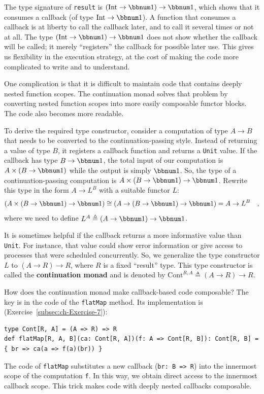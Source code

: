 The type signature of \lstinline!result! is $\left(\text{Int}\rightarrow\bbnum 1\right)\rightarrow\bbnum 1$,
which shows that it consumes a callback (of type $\text{Int}\rightarrow\bbnum 1$).
A function that consumes a callback is at liberty to call the callback
later, and to call it several times or not at all. The type $\left(\text{Int}\rightarrow\bbnum 1\right)\rightarrow\bbnum 1$
does not show whether the callback will be called; it merely \textsf{``}registers\textsf{''}
the callback for possible later use. This gives us flexibility in
the execution strategy, at the cost of making the code more complicated
to write and to understand.

One complication is that it is difficult to maintain code that contains
deeply nested function scopes. The continuation monad solves that
problem by converting nested function scopes into more easily composable
functor blocks. The code also becomes more readable.

To derive the required type constructor, consider a computation of
type $A\rightarrow B$ that needs to be converted to the continuation-passing
style. Instead of returning a value of type $B$, it registers a callback
function and returns a \lstinline!Unit! value. If the callback has
type $B\rightarrow\bbnum 1$, the total input of our computation is
$A\times\left(B\rightarrow\bbnum 1\right)$ while the output is simply
$\bbnum 1$. So, the type of a continuation-passing computation is
$A\times\left(B\rightarrow\bbnum 1\right)\rightarrow\bbnum 1$. Rewrite
this type in the form $A\rightarrow L^{B}$ with a suitable functor
$L$:
\[
\left(A\times\left(B\rightarrow\bbnum 1\right)\rightarrow\bbnum 1\right)\cong\left(A\rightarrow\left(B\rightarrow\bbnum 1\right)\rightarrow\bbnum 1\right)=A\rightarrow L^{B}\quad,
\]
where we need to define $L^{A}\triangleq\left(A\rightarrow\bbnum 1\right)\rightarrow\bbnum 1$.

It is sometimes helpful if the callback returns a more informative
value than \lstinline!Unit!. For instance, that value could show
error information or give access to processes that were scheduled
concurrently. So, we generalize the type constructor $L$ to $\left(A\rightarrow R\right)\rightarrow R$,
where $R$ is a fixed \textsf{``}result\textsf{''} type. This type constructor is
called the \textbf{continuation monad}
and is denoted by $\text{Cont}^{R,A}\triangleq\left(A\rightarrow R\right)\rightarrow R$.

How does the continuation monad make callback-based code composable?
The key is in the code of the \lstinline!flatMap! method. Its implementation
is (Exercise~\ref{subsec:ch-Exercise-7}):
\begin{lstlisting}
type Cont[R, A] = (A => R) => R
def flatMap[R, A, B](ca: Cont[R, A])(f: A => Cont[R, B]): Cont[R, B] = { br => ca(a => f(a)(br)) }
\end{lstlisting}
The code of \lstinline!flatMap! substitutes a new callback (\lstinline!br: B => R!)
into the innermost scope of the computation \lstinline!f!. In this
way, we obtain direct access to the innermost callback scope. This
trick makes code with deeply nested callbacks composable.


